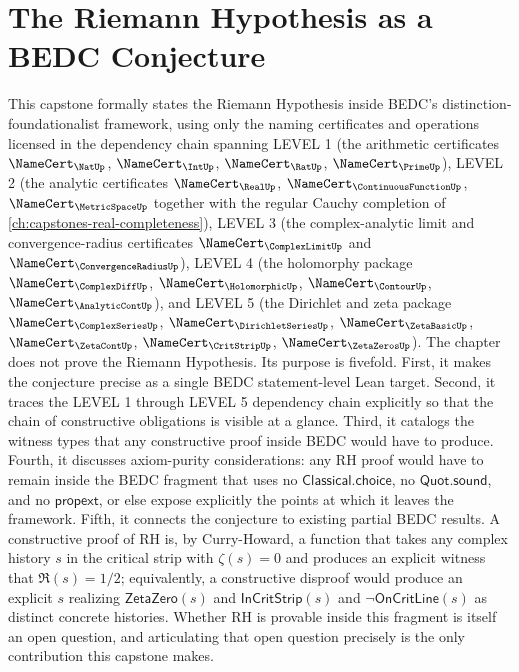 \chapter{The Riemann Hypothesis as a BEDC Conjecture}
\label{ch:capstones-riemann-hypothesis}

This capstone formally states the Riemann Hypothesis inside BEDC's distinction-foundationalist framework, using only the naming certificates and operations licensed in the dependency chain spanning LEVEL 1 (the arithmetic certificates $\NameCert_{\NatUp}$, $\NameCert_{\IntUp}$, $\NameCert_{\RatUp}$, $\NameCert_{\PrimeUp}$), LEVEL 2 (the analytic certificates $\NameCert_{\RealUp}$, $\NameCert_{\ContinuousFunctionUp}$, $\NameCert_{\MetricSpaceUp}$ together with the regular Cauchy completion of \autoref{ch:capstones-real-completeness}), LEVEL 3 (the complex-analytic limit and convergence-radius certificates $\NameCert_{\ComplexLimitUp}$ and $\NameCert_{\ConvergenceRadiusUp}$), LEVEL 4 (the holomorphy package $\NameCert_{\ComplexDiffUp}$, $\NameCert_{\HolomorphicUp}$, $\NameCert_{\ContourUp}$, $\NameCert_{\AnalyticContUp}$), and LEVEL 5 (the Dirichlet and zeta package $\NameCert_{\ComplexSeriesUp}$, $\NameCert_{\DirichletSeriesUp}$, $\NameCert_{\ZetaBasicUp}$, $\NameCert_{\ZetaContUp}$, $\NameCert_{\CritStripUp}$, $\NameCert_{\ZetaZerosUp}$). The chapter does not prove the Riemann Hypothesis. Its purpose is fivefold. First, it makes the conjecture precise as a single BEDC statement-level Lean target. Second, it traces the LEVEL 1 through LEVEL 5 dependency chain explicitly so that the chain of constructive obligations is visible at a glance. Third, it catalogs the witness types that any constructive proof inside BEDC would have to produce. Fourth, it discusses axiom-purity considerations: any RH proof would have to remain inside the BEDC fragment that uses no $\mathsf{Classical.choice}$, no $\mathsf{Quot.sound}$, and no $\mathsf{propext}$, or else expose explicitly the points at which it leaves the framework. Fifth, it connects the conjecture to existing partial BEDC results. A constructive proof of RH is, by Curry-Howard, a function that takes any complex history $s$ in the critical strip with $\zeta(s) = 0$ and produces an explicit witness that $\Re(s) = 1/2$; equivalently, a constructive disproof would produce an explicit $s$ realizing $\mathsf{ZetaZero}(s)$ and $\mathsf{InCritStrip}(s)$ and $\neg\mathsf{OnCritLine}(s)$ as distinct concrete histories. Whether RH is provable inside this fragment is itself an open question, and articulating that open question precisely is the only contribution this capstone makes.

